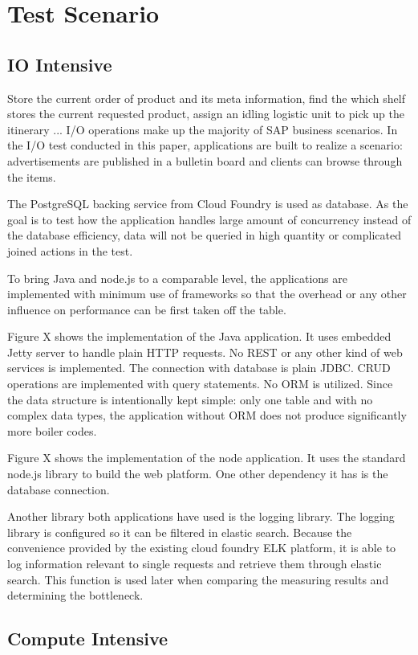 \chapter{Test Scenario}
\section{IO Intensive}
Store the current order of product and its meta information, find the which shelf stores the current requested product, assign an idling logistic unit to pick up the itinerary ... I/O operations make up the majority of SAP business scenarios.    
 In the I/O test conducted in this paper, applications are built to realize a scenario: advertisements are published in a bulletin board and clients can browse through the items. 

The PostgreSQL backing service from Cloud Foundry is used as database. As the goal is to test how the application handles large amount of concurrency instead of the database efficiency, data will not be queried in high quantity or complicated joined actions  in the test. 

To bring Java and node.js to a comparable level, the applications are implemented with minimum use of frameworks so that the overhead or any other influence on performance can be first taken off the table. 

Figure X shows the implementation of the Java application. It uses embedded Jetty server to handle plain HTTP requests. No REST or any other kind of web services is implemented. The connection with database is plain JDBC. CRUD operations are implemented with query statements. No ORM is utilized. Since the data structure is intentionally kept simple: only one table and with no complex data types, the application without ORM does not produce significantly more boiler codes.
 
Figure X shows the implementation of the node application. It uses the standard node.js library to build the web platform. One other dependency it has is the database connection. 

Another library both applications have used is the logging library. The logging library is configured so it can be filtered in elastic search. Because the convenience provided by the existing cloud foundry ELK platform, it is able to log information relevant to single requests and retrieve them through elastic search. This function is used later when comparing the measuring results and determining the bottleneck. 
     
\section{Compute Intensive}

